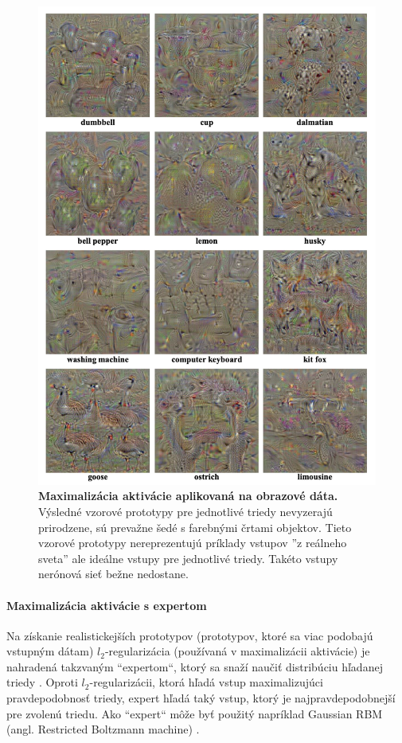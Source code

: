 \begin{figure}[h!]
\centering
\includegraphics[scale=0.6]{assets/images/activation_maximization.png}
\caption{\textbf{Maximalizácia aktivácie aplikovaná na obrazové dáta. \cite{simonyan2013deep}} Výsledné vzorové prototypy pre jednotlivé triedy nevyzerajú prirodzene, sú prevažne šedé s farebnými črtami objektov. Tieto vzorové prototypy nereprezentujú príklady vstupov ''z reálneho sveta'' ale ideálne vstupy pre jednotlivé triedy. Takéto vstupy nerónová sieť bežne nedostane.
}
\label{fig:activation_maximization}
\end{figure}

\paragraph{Maximalizácia aktivácie s expertom}
Na získanie realistickejších prototypov (prototypov, ktoré sa viac podobajú vstupným dátam) $l_2$-regularizácia (používaná v maximalizácii aktivácie) je nahradená takzvaným ``expertom``, ktorý sa snaží naučiť distribúciu hľadanej triedy \cite{montavon2018methods}. Oproti $l_2$-regularizácii, ktorá hľadá vstup maximalizujúci pravdepodobnosť triedy, expert hľadá taký vstup, ktorý je najpravdepodobnejší pre zvolenú triedu. Ako ``expert`` môže byť použitý napríklad Gaussian RBM (angl. Restricted Boltzmann machine) \cite{montavon2018methods}.

